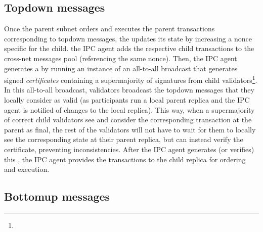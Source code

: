\subsection{Topdown messages}
Once the parent subnet orders and executes the parent transactions corresponding to topdown messages, the \gw updates its state by increasing a nonce specific for the child. the IPC agent adds the respective child transactions to the cross-net messages pool (referencing the same nonce). Then, the IPC agent generates a \pof by running an instance of an all-to-all broadcast that generates signed \emph{certificates} containing a supermajority of signatures from child validators\footnote{}. In this all-to-all broadcast, validators broadcast the topdown messages that they locally consider as valid (as participants run a local parent replica and the IPC agent is notified of changes to the local replica). This way, when a supermajority of correct child validators see and consider the corresponding transaction at the parent as final, the rest of the validators will not have to wait for them to locally see the corresponding state at their parent replica, but can instead verify the certificate, preventing inconsistencies. After the IPC agent generates (or verifies) this \prf, the IPC agent provides the transactions to the child replica for ordering and execution.


\subsection{Bottomup messages}  
